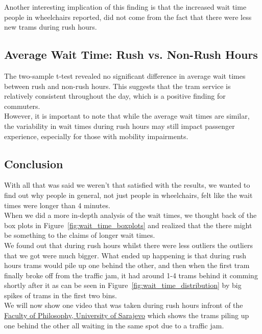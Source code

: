 \documentclass[a4paper, 10pt]{article}
\begin{document}
			\noindent Another interesting implication of this finding is that the increased wait time people in wheelchairs reported,
			did not come from the fact that there were less new trams during rush hours.

		\subsection{Average Wait Time: Rush vs. Non-Rush Hours}
			\noindent The two-sample t-test revealed no significant difference in average wait times between rush and non-rush hours. 
			This suggests that the tram service is relatively consistent throughout the day, which is a positive finding for commuters. \\

			\noindent However, it is important to note that while the average wait times are similar, 
			the variability in wait times during rush hours may still impact passenger experience, 
			especially for those with mobility impairments. \\

		\subsection{Conclusion}
			\noindent With all that was said we weren't that satisfied with the results, we wanted to find out why people in general,
			not just people in wheelchairs, felt like the wait times were longer than 4 minutes. \\

			\noindent When we did a more in-depth analysis of the wait times, we thought back of the box plots
			in Figure~\ref{fig:wait_time_boxplots} and realized that the there might be something to the claims of longer wait times. \\

			\noindent We found out that during rush hours whilst there were less outliers the outliers that we got were much bigger.
			What ended up happening is that during rush hours trams would pile up one behind the other, 
			and then when the first tram finally broke off from the traffic jam, it had around 1-4 trams behind it comming shortly after
			it as can be seen in Figure~\ref{fig:wait_time_distribution} by big spikes of trams in the first two bins. \\

			\noindent We will now show one video that was taken during rush hours infront of the 
			\href{https://maps.app.goo.gl/yeKMiUabPfgh9Tr18}{Faculty of Philosophy, University of Sarajevo} which shows the trams piling up one behind the other all waiting
			in the same spot due to a traffic jam. \\
\end{document}
